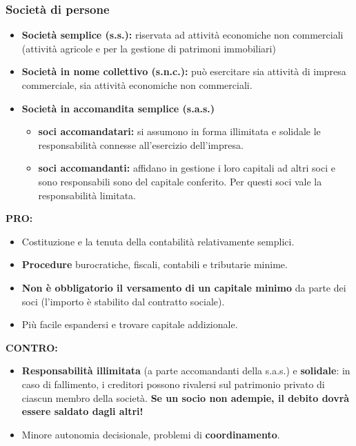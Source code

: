 \documentclass[../main.tex]{subfiles}
\begin{document}
\subsubsection{Società di persone}

\begin{itemize}
\item \textbf{Società semplice (s.s.):} riservata ad attività economiche non commerciali (attività agricole e per la gestione di patrimoni immobiliari)
\item \textbf{Società in nome collettivo (s.n.c.):} può esercitare sia attività di impresa commerciale, sia attività economiche non commerciali.
\item \textbf{Società in accomandita semplice (s.a.s.)}
	\begin{itemize}
	\item \textbf{soci accomandatari:} si assumono in forma illimitata e solidale le responsabilità connesse all'esercizio dell'impresa.
	\item \textbf{soci accomandanti:} affidano in gestione i loro capitali ad altri soci e sono responsabili sono del capitale conferito. Per questi soci vale la responsabilità limitata.
	
	\end{itemize}
\end{itemize}

\textbf{PRO:}
\begin{itemize}
\item Costituzione e la tenuta della contabilità relativamente semplici.

\item \textbf{Procedure} burocratiche, fiscali, contabili e tributarie minime.

\item \textbf{Non è obbligatorio il versamento di un capitale minimo} da parte dei soci (l'importo è stabilito dal contratto sociale).

\item Più facile espandersi e trovare capitale addizionale.

\end{itemize}

\textbf{CONTRO:}
\begin{itemize}
\item \textbf{Responsabilità illimitata} (a parte accomandanti della s.a.s.) e \textbf{solidale}: in caso di fallimento, i creditori possono rivalersi sul patrimonio privato di ciascun membro della società. \textbf{Se un socio non adempie, il debito dovrà essere saldato dagli altri!}
\item Minore autonomia decisionale, problemi di \textbf{coordinamento}.

\end{itemize}
\end{document}
